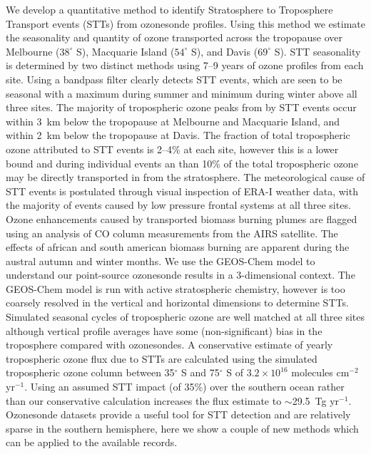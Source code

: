   We develop a quantitative method to identify Stratosphere to Troposphere Transport events (STTs) from ozonesonde profiles. 
  Using this method we estimate the seasonality and quantity of ozone transported across the tropopause over Melbourne ($38^\circ$ S), Macquarie Island ($54^\circ$ S), and Davis ($69^\circ$ S).
  STT seasonality is determined by two distinct methods using 7--9 years of ozone profiles from each site.
  Using a bandpass filter clearly detects STT events, which are seen to be seasonal with a maximum during summer and minimum during winter above all three sites.
  The majority of tropospheric ozone peaks from by STT events occur within 3~km below the tropopause at Melbourne and Macquarie Island, and within 2~km below the tropopause at Davis.
  The fraction of total tropospheric ozone attributed to STT events is 2–4\% at each site, however this is a lower bound and during individual events an than 10\% of the total tropospheric ozone may be directly transported in from the stratosphere.
  The meteorological cause of STT events is postulated through visual inspection of ERA-I weather data, with the majority of events caused by low pressure frontal systems at all three sites.
  Ozone enhancements caused by transported biomass burning plumes are flagged using an analysis of CO column measurements from the AIRS satellite.
  The effects of african and south american biomass burning are apparent during the austral autumn and winter months.
  We use the GEOS-Chem model to understand our point-source ozonesonde results in a 3-dimensional context.
  The GEOS-Chem model is run with active stratospheric chemistry, however is too coarsely resolved in the vertical and horizontal dimensions to determine STTs.
  Simulated seasonal cycles of tropospheric ozone are well matched at all three sites although vertical profile averages have some (non-significant) bias in the troposphere compared with ozonesondes.
  A conservative estimate of yearly tropospheric ozone flux due to STTs are calculated using the simulated tropospheric ozone column between 35$^\circ$ S and 75$^\circ$ S of $3.2\times10^{16}$ molecules cm$^{-2}$ yr$^{-1}$.
  Using an assumed STT impact (of 35\%) over the southern ocean rather than our conservative calculation increases the flux estimate to $\sim$29.5~Tg yr$^{-1}$.
  Ozonesonde datasets provide a useful tool for STT detection and are relatively sparse in the southern hemisphere, here we show a couple of new methods which can be applied to the available records.
  
